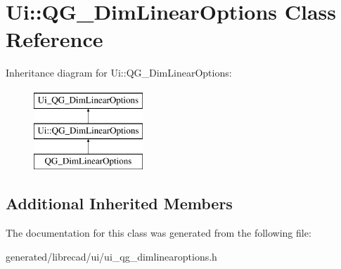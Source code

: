 \hypertarget{classUi_1_1QG__DimLinearOptions}{\section{Ui\-:\-:Q\-G\-\_\-\-Dim\-Linear\-Options Class Reference}
\label{classUi_1_1QG__DimLinearOptions}
}
Inheritance diagram for Ui\-:\-:Q\-G\-\_\-\-Dim\-Linear\-Options\-:\begin{figure}[H]
\begin{center}
\leavevmode
\includegraphics[height=3.000000cm]{classUi_1_1QG__DimLinearOptions}
\end{center}
\end{figure}
\subsection*{Additional Inherited Members}


The documentation for this class was generated from the following file\-:\begin{DoxyCompactItemize}
\item 
generated/librecad/ui/ui\-\_\-qg\-\_\-dimlinearoptions.\-h\end{DoxyCompactItemize}

